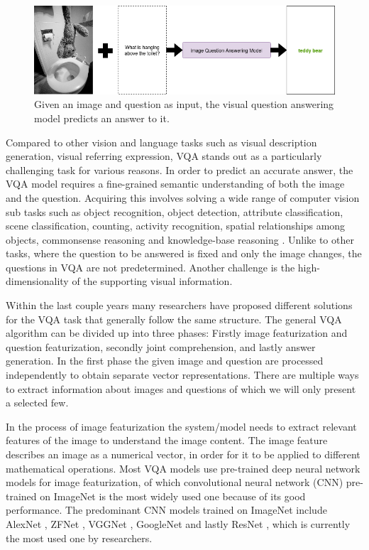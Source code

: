 \documentclass{article}
\begin{document}
\begin{figure}[H]
	\centering
	\includegraphics[width=\linewidth]{vqa_teddy_tiny.png}
	\caption{Given an image and question as input, the visual question answering model predicts an answer to it.}
	\label{fig:vqa-graph}
\end{figure}

Compared to other vision and language tasks such as visual description generation, visual referring expression, VQA stands out as a particularly challenging task for various reasons. In order to predict an accurate answer, the VQA model requires a fine-grained semantic understanding of both the image and the question. Acquiring this involves solving a wide range of computer vision sub tasks such as object recognition, object detection, attribute classification, scene classification, counting, activity recognition, spatial relationships among objects, commonsense reasoning and knowledge-base reasoning \citep{manmadhan2020vqa}. Unlike to other tasks, where the question to be answered is fixed and only the image changes, the questions in VQA are not predetermined. Another challenge is the high-dimensionality of the supporting visual information.

Within the last couple years many researchers have proposed different solutions for the VQA task that generally follow the same structure. The general VQA algorithm can be divided up into three phases: Firstly image featurization and question featurization, secondly joint comprehension, and lastly answer generation.
In the first phase the given image and question are processed independently to obtain separate vector representations. There are multiple ways to extract information about images and questions of which we will only present a selected few.

In the process of image featurization the system/model needs to extract relevant features of the image to understand the image content. The image feature describes an image as a numerical vector, in order for it to be applied to different mathematical operations. Most VQA models use pre-trained deep neural network models for image featurization, of which convolutional neural network (CNN) \citep{krizhevsky2012imagenet} pre-trained on ImageNet \citep{russakovsky2015imagenet} is the most widely used one because of its good performance. The predominant CNN models trained on ImageNet include AlexNet \citep{krizhevsky2012imagenet}, ZFNet \citep{zeiler2014visual}, VGGNet \citep{simonyan2015very}, GoogleNet \citep{szegedy2015going} and lastly ResNet \citep{residual}, which is currently the most used one by researchers.
\end{document}
